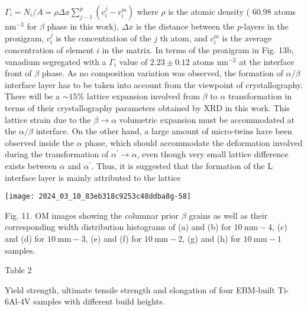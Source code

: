 \documentclass[10pt]{article}
\begin{document}
$\Gamma_{i}=N_{i} / A=\rho \Delta x \sum_{j-1}^{p}\left(c_{i}^{j}-c_{i}^{m}\right)$ where $\rho$ is the atomic density ( 60.98 atoms $\mathrm{nm}^{-3}$ for $\beta$ phase in this work), $\Delta x$ is the distance between the $p$-layers in the proxigram, $c_{i}^{j}$ is the concentration of the $j$ th atom, and $c_{i}^{m}$ is the average concentration of element $i$ in the matrix. In terms of the proxigram in Fig. 13b, vanadium segregated with a $\Gamma_{i}$ value of $2.23 \pm 0.12$ atoms $\mathrm{nm}^{-2}$ at the interface front of $\beta$ phase. As no composition variation was observed, the formation of $\alpha / \beta$ interface layer has to be taken into account from the viewpoint of crystallography. There will be a $\sim 15 \%$ lattice expansion involved from $\beta$ to $\alpha$ transformation in terms of their crystallography parameters obtained by XRD in this work. This lattice strain due to the $\beta \rightarrow \alpha$ volumetric expansion must be accommodated at the $\alpha / \beta$ interface. On the other hand, a large amount of micro-twins have been observed inside the $\alpha$ phase, which should accommodate the deformation involved during the transformation of $\alpha^{\prime} \rightarrow \alpha$, even though very small lattice difference exists between $\alpha$ and $\alpha^{\prime}$. Thus, it is suggested that the formation of the L interface layer is mainly attributed to the lattice

\begin{center}
\texttt{[image: 2024\_03\_10\_83eb318c9253c48ddba8g-58]}
\end{center}

Fig. 11. OM images showing the columnar prior $\beta$ grains as well as their corresponding width distribution histograms of (a) and (b) for $10 \mathrm{~mm}-4$, (c) and (d) for $10 \mathrm{~mm}-3$, (e) and (f) for $10 \mathrm{~mm}-2$, (g) and (h) for $10 \mathrm{~mm}-1$ samples.

Table 2

Yield strength, ultimate tensile strength and elongation of four EBM-built Ti-6Al-4V samples with different build heights.
\end{document}
